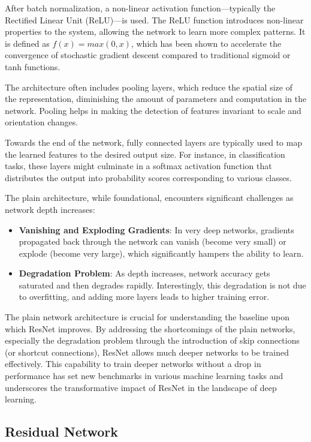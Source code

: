 After batch normalization, a non-linear activation function—typically the Rectified Linear Unit
(ReLU)—is used. The ReLU function introduces non-linear properties to the system, allowing the
network to learn more complex patterns. It is defined as $f(x)=max(0,x)$, which has been shown to
accelerate the convergence of stochastic gradient descent compared to traditional sigmoid or tanh
functions.

The architecture often includes pooling layers, which reduce the spatial size of the representation,
diminishing the amount of parameters and computation in the network. Pooling helps in making the
detection of features invariant to scale and orientation changes.

Towards the end of the network, fully connected layers are typically used to map the learned
features to the desired output size. For instance, in classification tasks, these layers might
culminate in a softmax activation function that distributes the output into probability scores
corresponding to various classes.

The plain architecture, while foundational, encounters significant challenges as network depth
increases:

\begin{itemize}
    \item \textbf{Vanishing and Exploding Gradients}: In very deep networks, gradients propagated back through the network can vanish (become very small) or explode (become very large), which significantly hampers the ability to learn.
    \item \textbf{Degradation Problem}: As depth increases, network accuracy gets saturated and then degrades rapidly. Interestingly, this degradation is not due to overfitting, and adding more layers leads to higher training error.
\end{itemize}

The plain network architecture is crucial for understanding the baseline upon which ResNet improves.
By addressing the shortcomings of the plain networks, especially the degradation problem through the
introduction of skip connections (or shortcut connections), ResNet allows much deeper networks to be
trained effectively. This capability to train deeper networks without a drop in performance has set
new benchmarks in various machine learning tasks and underscores the transformative impact of ResNet
in the landscape of deep learning.

\subsection{Residual Network}

